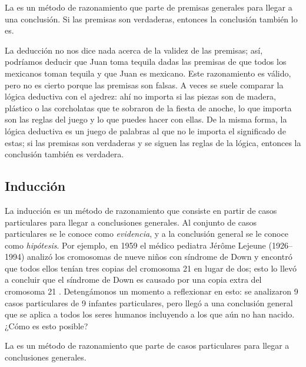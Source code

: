 \begin{remember}
    \label{rem:deduccion}
    La  es un método de razonamiento que parte de
    premisas generales para llegar a una conclusión.
    Si las premisas son verdaderas, entonces la conclusión también lo es.
\end{remember}

La deducción no nos dice nada acerca de la validez de las premisas; así,
podríamos deducir que Juan toma tequila dadas las premisas de que todos los
mexicanos toman tequila y que Juan es mexicano.
Este razonamiento es válido, pero no es cierto porque las premisas son falsas.
A veces se suele comparar la lógica deductiva con el ajedrez: ahí no importa si
las piezas son de madera, plástico o las corcholatas que te sobraron de la
fiesta de anoche, lo que importa son las reglas del juego y lo que puedes
hacer con ellas.
De la misma forma, la lógica deductiva es un juego de palabras al que no le
importa el significado de estas; si las premisas son verdaderas y se siguen las
reglas de la lógica, entonces la conclusión también es verdadera.

\subsection*{Inducción}
\label{sub:induccion}
La inducción es un método de razonamiento que consiste en partir de casos
particulares para llegar a conclusiones generales.
Al conjunto de casos particulares se le conoce como \emph{evidencia}, y a la
conclusión general se le conoce como \emph{hipótesis}.
Por ejemplo, en 1959 el médico pediatra Jérôme Lejeune (1926--1994) analizó los
cromosomas de nueve niños con síndrome de Down y encontró que todos ellos tenían
tres copias del cromosoma 21 en lugar de dos; esto lo llevó a concluir que el
síndrome de Down es causado por una copia extra del cromosoma 21%
\cite{Lejeune1959}.
Detengámonos un momento a reflexionar en esto: se analizaron 9 casos
particulares de 9 infantes particulares, pero llegó a una conclusión general que
se aplica a todos los seres humanos incluyendo a los que aún no han nacido.
¿Cómo es esto posible?

\begin{remember}
    \label{rem:induccion}
    La  es un método de razonamiento que parte de casos
    particulares para llegar a conclusiones generales.
\end{remember}

